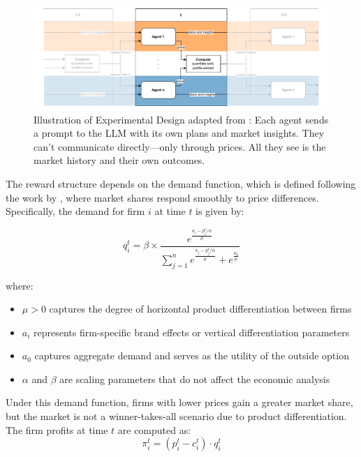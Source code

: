 \begin{figure}[htpb!]
  \centering
  \includegraphics[width=1\linewidth]{latex/imgs/illustration_diagram_experiment.pdf}
    \caption{Illustration of Experimental Design adapted from \textcite[p. 9]{fish_algorithmic_2025}: Each agent sends a prompt to the LLM with its own plans and market insights. They can't communicate directly—only through prices. All they see is the market history and their own outcomes.}
    \label{fig:experimental_design}
\end{figure}

The reward structure depends on the demand function, which is defined following the work by \textcite{calvano_artificial_2020}, where market shares respond smoothly to price differences. Specifically, the demand for firm $i$ at time $t$ is given by:

\begin{equation}\label{eq:calvano}
    q_i^t = \beta \times \frac{e^{\frac{a_i - p_i^t/\alpha}{\mu}}}{\sum_{j=1}^{n} e^{\frac{a_j - p_j^t/\alpha}{\mu}} + e^{\frac{a_0}{\mu}}}
\end{equation}

where:
\begin{itemize}[noitemsep]
    \item $\mu > 0$ captures the degree of horizontal product differentiation between firms
    \item $a_i$ represents firm-specific brand effects or vertical differentiation parameters
    \item $a_0$ captures aggregate demand and serves as the utility of the outside option
    \item $\alpha$ and $\beta$ are scaling parameters that do not affect the economic analysis
\end{itemize}

Under this demand function, firms with lower prices gain a greater market share, but the market is not a winner-takes-all scenario due to product differentiation. The firm profits at time $t$ are computed as: 
\begin{equation}
    \pi_i^t = (p_i^t - c_i^t) \cdot q_i^t
\end{equation}

